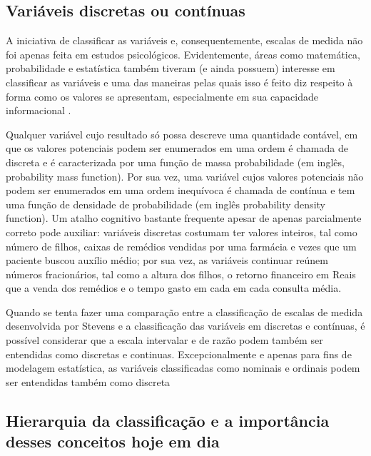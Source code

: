 \documentclass[
]{book}
\begin{document}
\hypertarget{variuxe1veis-discretas-ou-contuxednuas}{%
\subsection{Variáveis discretas ou contínuas}\label{variuxe1veis-discretas-ou-contuxednuas}}

A iniciativa de classificar as variáveis e, consequentemente, escalas de medida não foi apenas feita em estudos psicológicos. Evidentemente, áreas como matemática, probabilidade e estatística também tiveram (e ainda possuem) interesse em classificar as variáveis e uma das maneiras pelas quais isso é feito diz respeito à forma como os valores se apresentam, especialmente em sua capacidade informacional \citep{morettin_bussab_2010}.

Qualquer variável cujo resultado só possa descreve uma quantidade contável, em que os valores potenciais podem ser enumerados em uma ordem é chamada de discreta e é caracterizada por uma função de massa probabilidade (em inglês, probability mass function). Por sua vez, uma variável cujos valores potenciais não podem ser enumerados em uma ordem inequívoca é chamada de contínua e tem uma função de densidade de probabilidade (em inglês probability density function). Um atalho cognitivo bastante frequente apesar de apenas parcialmente correto pode auxiliar: variáveis discretas costumam ter valores inteiros, tal como número de filhos, caixas de remédios vendidas por uma farmácia e vezes que um paciente buscou auxílio médio; por sua vez, as variáveis continuar reúnem números fracionários, tal como a altura dos filhos, o retorno financeiro em Reais que a venda dos remédios e o tempo gasto em cada em cada consulta média.

Quando se tenta fazer uma comparação entre a classificação de escalas de medida desenvolvida por Stevens e a classificação das variáveis em discretas e contínuas, é possível considerar que a escala intervalar e de razão podem também ser entendidas como discretas e continuas. Excepcionalmente e apenas para fins de modelagem estatística, as variáveis classificadas como nominais e ordinais podem ser entendidas também como discreta \citep[p.20]{Borgatta1980, privitera2016}

\hypertarget{hierarquia-da-classificauxe7uxe3o-e-a-importuxe2ncia-desses-conceitos-hoje-em-dia}{%
\subsection{Hierarquia da classificação e a importância desses conceitos hoje em dia}\label{hierarquia-da-classificauxe7uxe3o-e-a-importuxe2ncia-desses-conceitos-hoje-em-dia}}
\end{document}
